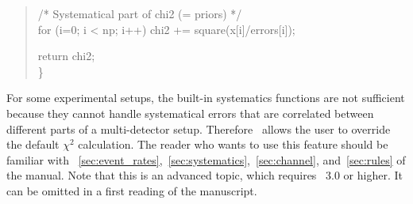 {\begin{quote}
{  \hspace*{0.3cm} /* Systematical part of chi2 (= priors) */ \\
  \hspace*{0.3cm} for (i=0; i < np; i++)  chi2 += square(x[i]/errors[i]);

 \hspace*{0.3cm} return chi2; \\
\} 
}
\end{quote}
}

For some experimental setups, the built-in systematics functions are not sufficient
because they cannot handle systematical errors that are correlated between different
parts of a multi-detector setup. Therefore \GLOBES\ allows the user
to override the default $\chi^2$ calculation. The reader who wants to use this
feature should be familiar with \Secs~\ref{sec:event_rates},~\ref{sec:systematics},~\ref{sec:channel}, and~\ref{sec:rules}
of the manual. Note that this is an advanced topic, which requires \GLOBES\ 3.0 or
higher. It can be omitted in a first reading of the manuscript.

